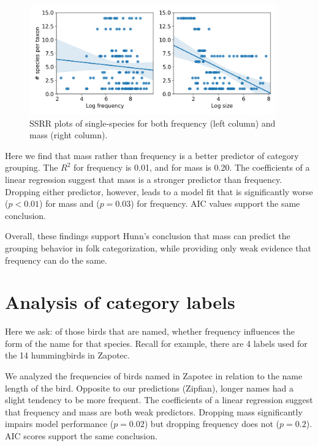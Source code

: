 \documentclass[10pt,letterpaper]{article}
\begin{document}
\begin{figure}[!ht]
  \begin{center}
    \includegraphics[width=0.95\textwidth]{./figures/ssrr-singlespecies.png}
        \caption{SSRR plots of single-species for both frequency (left column) and mass (right column).}
        \label{fig-ssrr}
  \end{center}
\end{figure}

Here we find that mass rather than frequency is a better predictor of category grouping. The $R^2$ for frequency is 0.01, and for mass is 0.20. The coefficients of a linear regression suggest that mass is a stronger predictor than frequency. Dropping either predictor, however, leads to a model fit that is significantly worse ($p < 0.01$) for mass and ($p = 0.03$) for frequency. AIC values support the same conclusion.

Overall, these findings support Hunn's conclusion that mass can predict the grouping behavior in folk categorization, while providing only weak evidence that frequency can do the same.




\section{Analysis of category labels}
Here we ask: of those birds that are named, whether frequency influences the form of the name for that species. Recall for example, there are 4 labels used for the 14 hummingbirds in Zapotec.

We analyzed the frequencies of birds named in Zapotec in relation to the name length of the bird. Opposite to our predictions (Zipfian), longer names had a slight tendency to be more frequent. The coefficients of a linear regression suggest that frequency and mass are both weak predictors. Dropping mass significantly impairs model performance ($p = 0.02$) but dropping frequency does not ($p = 0.2$). AIC scores support the same conclusion.
\end{document}
